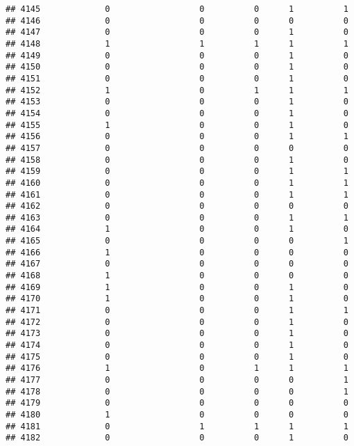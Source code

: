 \documentclass[
]{article}
\begin{document}
\begin{verbatim}
## 4145             0                  0          0      1          1
## 4146             0                  0          0      0          0
## 4147             0                  0          0      1          0
## 4148             1                  1          1      1          1
## 4149             0                  0          0      1          0
## 4150             0                  0          0      1          0
## 4151             0                  0          0      1          0
## 4152             1                  0          1      1          1
## 4153             0                  0          0      1          0
## 4154             0                  0          0      1          0
## 4155             1                  0          0      1          0
## 4156             0                  0          0      1          1
## 4157             0                  0          0      0          0
## 4158             0                  0          0      1          0
## 4159             0                  0          0      1          1
## 4160             0                  0          0      1          1
## 4161             0                  0          0      1          1
## 4162             0                  0          0      0          0
## 4163             0                  0          0      1          1
## 4164             1                  0          0      1          0
## 4165             0                  0          0      0          1
## 4166             1                  0          0      0          0
## 4167             0                  0          0      0          0
## 4168             1                  0          0      0          0
## 4169             1                  0          0      1          0
## 4170             1                  0          0      1          0
## 4171             0                  0          0      1          1
## 4172             0                  0          0      1          0
## 4173             0                  0          0      1          0
## 4174             0                  0          0      1          0
## 4175             0                  0          0      1          0
## 4176             1                  0          1      1          1
## 4177             0                  0          0      0          1
## 4178             0                  0          0      0          1
## 4179             0                  0          0      0          0
## 4180             1                  0          0      0          0
## 4181             0                  1          1      1          1
## 4182             0                  0          0      1          0

\end{verbatim}
\end{document}

